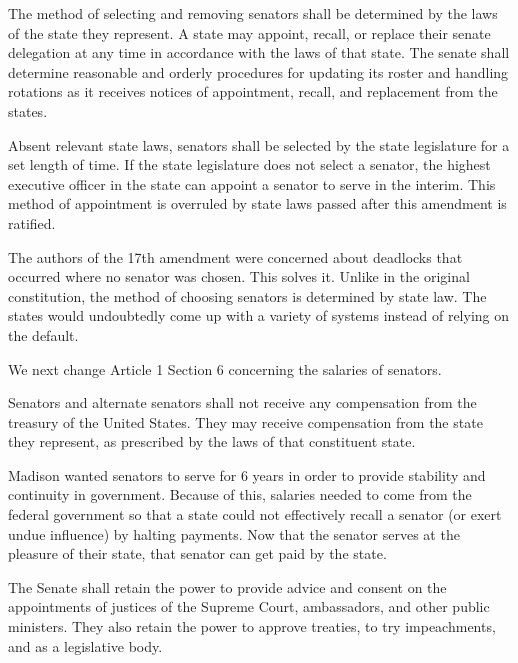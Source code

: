 \documentclass{article}
\begin{document}
\begin{quoting}
The method of selecting and removing senators shall be determined by the laws of the state they represent. A state may appoint, recall, or replace their senate delegation at any time in accordance with the laws of that state. The senate shall determine reasonable and orderly procedures for updating its roster and handling rotations as it receives notices of appointment, recall, and replacement from the states.

Absent relevant state laws, senators shall be selected by the state legislature for a set length of time. If the state legislature does not select a senator, the highest executive officer in the state can appoint a senator to serve in the interim. This method of appointment is overruled by state laws passed after this amendment is ratified.
\end{quoting}

The authors of the 17th amendment were concerned about deadlocks that occurred where no senator was chosen. This solves it. Unlike in the original constitution, the method of choosing senators is determined by state law. The states would undoubtedly come up with a variety of systems instead of relying on the default.

We next change Article 1 Section 6 concerning the salaries of senators.

\begin{quoting}
Senators and alternate senators shall not receive any compensation from the treasury of the United States. They may receive compensation from the state they represent, as prescribed by the laws of that constituent state.
\end{quoting}

Madison wanted senators to serve for 6 years in order to provide stability and continuity in government\cite{Senate}. Because of this, salaries needed to come from the federal government so that a state could not effectively recall a senator (or exert undue influence) by halting payments. Now that the senator serves at the pleasure of their state, that senator can get paid by the state.

\begin{quoting}
The Senate shall retain the power to provide advice and consent on the appointments of justices of the Supreme Court, ambassadors, and other public ministers. They also retain the power to approve treaties, to try impeachments, and as a legislative body.
\end{quoting}
\end{document}
